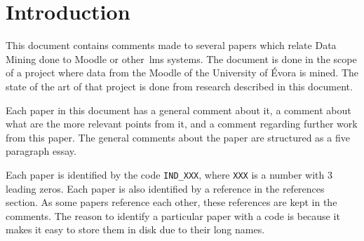 \chapter{Introduction}

This document contains comments made to several papers which relate Data Mining
done to Moodle or other~\gls{lms} systems. The document is done in the scope of
a project where data from the Moodle of the University of Évora is mined. The
state of the art of that project is done from research described in this
document.

Each paper in this document has a general comment about it, a comment about
what are the more relevant points from it, and a comment regarding further work
from this paper. The general comments about the paper are structured as a five
paragraph essay.

Each paper is identified by the code \texttt{IND\_XXX}, where \texttt{XXX} is a
number with 3 leading zeros. Each paper is also identified by a reference in
the references section. As some papers reference each other, these references
are kept in the comments. The reason to identify a particular paper with a code
is because it makes it easy to store them in disk due to their long names.
